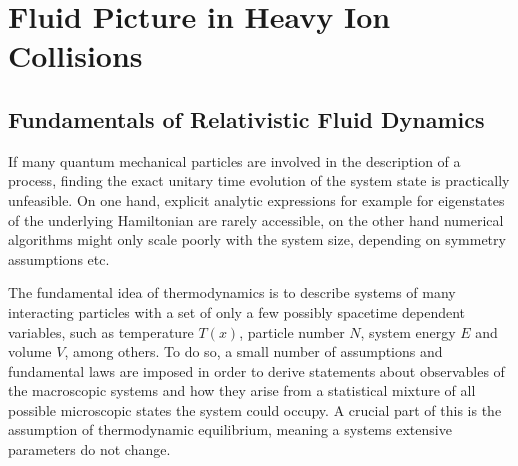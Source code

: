 \chapter{Fluid Picture in Heavy Ion Collisions}

\section{Fundamentals of Relativistic Fluid Dynamics}

If many quantum mechanical particles are involved in the description of a process, finding the exact unitary time evolution of the system state is practically unfeasible. On one hand, explicit analytic expressions for example for eigenstates of the underlying Hamiltonian are rarely accessible, on the other hand numerical algorithms might only scale poorly with the system size, depending on symmetry assumptions etc.

The fundamental idea of thermodynamics is to describe systems of many interacting particles with a set of only a few possibly spacetime dependent variables, such as temperature $T(x)$, particle number $N$, system energy $E$ and volume $V$, among others. To do so, a small number of assumptions and fundamental laws are imposed in order to derive statements about observables of the macroscopic systems and how they arise from a statistical mixture of all possible microscopic states the system could occupy. A crucial part of this is the assumption of thermodynamic equilibrium, meaning a systems extensive parameters do not change. 

